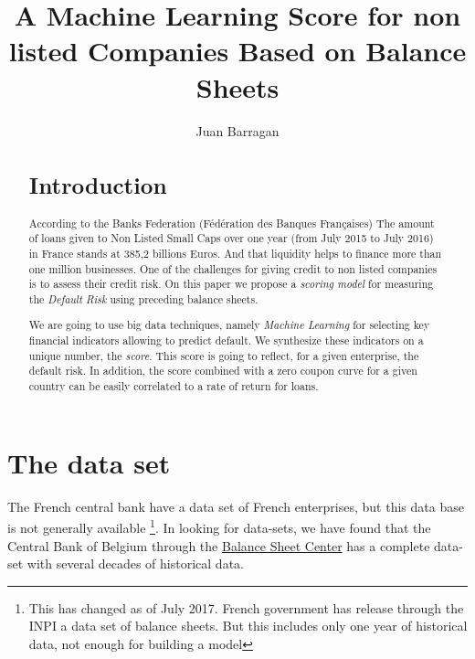 \documentclass[DIV=calc, paper=a4, fontsize=11pt, twocolumn]{scrartcl}
\title{ A Machine Learning Score for non listed Companies Based on Balance Sheets}
\author{Juan Barragan}
\date{}
\begin{document}
\maketitle 
\tableofcontents
\thispagestyle{fancy}
\begin{abstract}
\section{Introduction}
According to the  Banks Federation (Fédération des Banques Françaises) The amount of loans given to Non Listed Small Caps 
over one year (from July 2015 to July 2016) in France stands at 385,2 billions Euros. And that liquidity helps to finance more than 
one million businesses. One of the challenges for giving credit to non listed companies is to assess their credit risk. 
On this paper we propose a \emph{scoring model} for measuring the \emph{Default Risk} using preceding balance sheets.

We are going to use big data techniques, namely \emph{Machine Learning} for selecting key financial indicators allowing to predict default.
We synthesize these indicators on a unique number, the \emph{score}. This score is going to reflect, for a given enterprise, the default 
risk. In addition, the score combined with a zero coupon curve for a given country can be easily correlated to a rate of return for loans. 

\end{abstract}

\section{The data set}
The French central bank have a data set of French enterprises, but this data base is not generally available \footnote{This has changed as of July 2017.
French government has release through the INPI a data set of balance sheets. But this includes only one year of historical data, not enough 
for building a model}. 
In looking for data-sets, we have found that the Central Bank of Belgium through the 
\href{https://www.nbb.be/fr/centrale-des-bilans}{Balance Sheet Center} has a complete data-set with several decades of
historical data.
\end{document}
